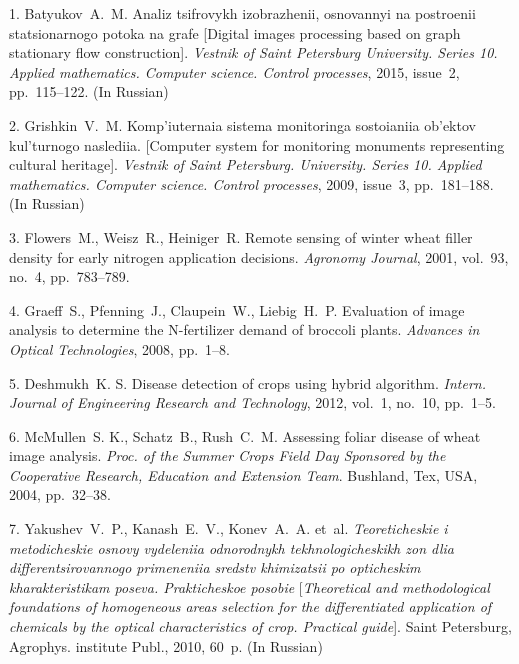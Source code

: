 

{\footnotesize

\vskip 3mm


\vskip 2mm



1. {Batyukov~A.~M.} Analiz tsifrovykh izobrazhenii, osnovannyi na
postroenii statsionarnogo potoka na grafe [Digital images
processing based on graph stationary flow construction]. {\it
Vestnik of Saint Petersburg University. Series 10. Applied
mathematics. Computer science. Control processes}, 2015, issue~2,
pp.~115--122. (In Russian)

2. {Grishkin~V.~M.} Komp'iuternaia sistema monitoringa sostoianiia
ob'ektov kul'turnogo naslediia. [Computer system for monitoring
monuments representing cultural heritage]. {\it Vestnik of Saint
Petersburg. University. Series 10. Applied mathematics. Computer
science. Control processes}, 2009, issue~3, pp.~181--188. (In
Russian)

3. {Flowers~M., Weisz~R., Heiniger~R.} Remote sensing of winter
wheat filler density for early nitrogen application decisions.
{\it Agronomy Journal}, 2001, vol.~93, no.~4, pp.~783--789.

4. {Graeff~S., Pfenning~J., Claupein~W., Liebig~H.~P.} Evaluation
of image analysis to determine the N-fertilizer demand of broccoli
plants. {\it Advances in Optical Technologies}, 2008, pp.~1--8.

5. {Deshmukh~K. S.} Disease detection of crops using hybrid
algorithm. {\it Intern. Journal of Engineering Research and
Technology}, 2012, vol.~1, no.~10, pp.~1--5.

6. {McMullen~S. K., Schatz~B., Rush~C.~M.} Assessing foliar
disease of wheat image analysis. {\it Proc. of the Summer Crops
Field Day Sponsored by the Cooperative Research, Education and
Extension Team}. Bushland, Tex, USA, 2004, pp.~32--38.

7. {Yakushev~V.~P., Kanash~E.~V., Konev~A.~A. et~al.} {\it
Teoreticheskie i metodicheskie osnovy vydeleniia odnorodnykh
tekhnologicheskikh zon dlia differentsirovannogo primeneniia
sredstv khimizatsii po opticheskim kharakteristikam poseva.
Prakticheskoe posobie} [{\it Theoretical and methodological
foundations of homogeneous areas selection for the differentiated
application of chemicals by the optical characteristics of crop.
Practical guide}]. Saint Petersburg, Agrophys. institute Publ.,
2010, 60~p. (In Russian)

}
